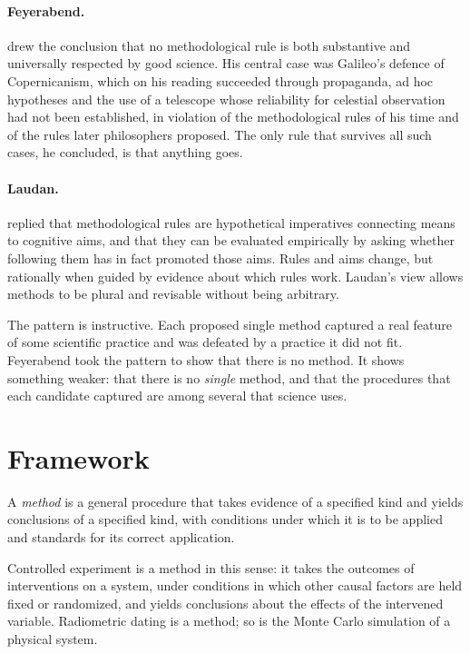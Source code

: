 \documentclass{situationist-preprint}
\begin{document}
\paragraph{Feyerabend.} \citet{Feyerabend1975} drew the conclusion that no methodological rule is both substantive and universally respected by good science. His central case was Galileo's defence of Copernicanism, which on his reading succeeded through propaganda, ad hoc hypotheses and the use of a telescope whose reliability for celestial observation had not been established, in violation of the methodological rules of his time and of the rules later philosophers proposed. The only rule that survives all such cases, he concluded, is that anything goes.

\paragraph{Laudan.} \citet{Laudan1984} replied that methodological rules are hypothetical imperatives connecting means to cognitive aims, and that they can be evaluated empirically by asking whether following them has in fact promoted those aims. Rules and aims change, but rationally when guided by evidence about which rules work. Laudan's view allows methods to be plural and revisable without being arbitrary.

The pattern is instructive. Each proposed single method captured a real feature of some scientific practice and was defeated by a practice it did not fit. Feyerabend took the pattern to show that there is no method. It shows something weaker: that there is no \emph{single} method, and that the procedures that each candidate captured are among several that science uses.

\section{Framework}

\begin{definition}[Method]\label{d:method}
A \emph{method} is a general procedure that takes evidence of a specified kind and yields conclusions of a specified kind, with conditions under which it is to be applied and standards for its correct application.
\end{definition}

Controlled experiment is a method in this sense: it takes the outcomes of interventions on a system, under conditions in which other causal factors are held fixed or randomized, and yields conclusions about the effects of the intervened variable. Radiometric dating is a method; so is the Monte Carlo simulation of a physical system.
\end{document}

